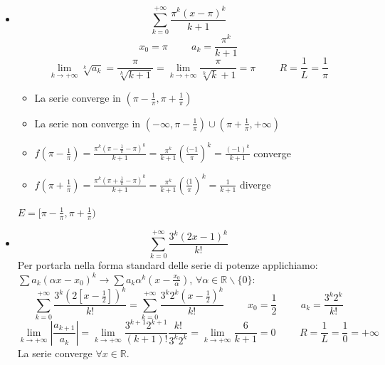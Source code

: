 \begin{example}
\begin{itemize}
         
         \item \begin{equation*}\sum^{+\infty}_{k=0}\frac{\pi^k(x-\pi)^k}{k+1}\end{equation*}
         \begin{equation*}x_0=\pi\hspace{1cm}a_k=\frac{\pi^k}{k+1}\end{equation*}
         \begin{equation*}
             \lim_{k\to+\infty}\sqrt[k]{a_k}=\frac{\pi}{\sqrt[k]{k+1}}=\lim_{k\to+\infty}\frac{\pi}{\sqrt[k]{k}+1}=\pi\hspace{1cm}R=\frac{1}{L}=\frac{1}{\pi}
        \end{equation*}
         \begin{itemize}
             \item[] La serie converge in $(\pi-\frac{1}{\pi}, \pi+\frac{1}{\pi})$
             \item[] La serie non converge in $(-\infty,\pi-\frac{1}{\pi})\cup(\pi+\frac{1}{\pi}, +\infty)$
             \item[] $f(\pi-\frac{1}{\pi})=\frac{\pi^k(\pi-\frac{1}{\pi}-\pi)^k}{k+1}=\frac{\pi^k}{k+1}(\frac{(-1}{\pi})^k=\frac{(-1)^k}{k+1}$ converge
             \item[] $f(\pi+\frac{1}{\pi})=\frac{\pi^k(\pi+\frac{1}{\pi}-\pi)^k}{k+1}=\frac{\pi^k}{k+1}(\frac{(1}{\pi})^k=\frac{1}{k+1}$ diverge
         \end{itemize}
         \begin{center}
             $E=[\pi-\frac{1}{\pi}, \pi+\frac{1}{\pi})$
         \end{center}
         
         \item \begin{equation*}\sum^{+\infty}_{k=0}\frac{3^k(2x-1)^k}{k!}\end{equation*}
         Per portarla nella forma standard delle serie di potenze applichiamo: $\sum a_k(\alpha x-x_0)^k\to\sum a_k\alpha^k(x-\frac{x_0}{\alpha})$, $\forall\alpha\in\mathbb{R}\backslash\{0\}$:
         \begin{equation*}
             \sum^{+\infty}_{k=0}\frac{3^k(2[x-\frac{1}{2}])^k}{k!}=\sum^{+\infty}_{k=0}\frac{3^k2^k(x-\frac{1}{2})^k}{k!}\hspace{1cm}x_0=\frac{1}{2}\hspace{1cm}a_k=\frac{3^k2^k}{k!}
         \end{equation*}
         \begin{equation*}
             \lim_{k\to+\infty}|\frac{a_{k+1}}{a_k}|=\lim_{k\to+\infty}\frac{3^{k+1}2^{k+1}}{(k+1)!}\frac{k!}{3^k2^k}=\lim_{k\to+\infty}\frac{6}{k+1}=0\hspace{1cm}R=\frac{1}{L}=\frac{1}{0}=+\infty
         \end{equation*}
         La serie converge $\forall x\in\mathbb{R}$.
         

\end{itemize}
\end{example}
